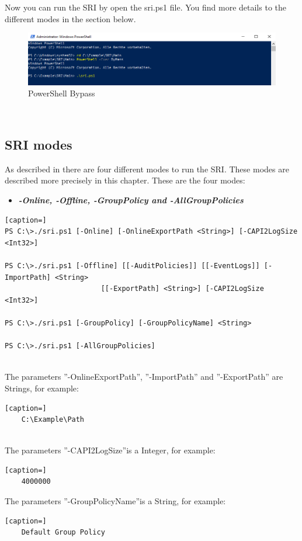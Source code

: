 Now you can run the SRI by open the sri.ps1 file. You find more details to the different modes in the section below.
\begin{figure}[H]
    \centering
    \includegraphics[width=1\linewidth]{assets/sri_ps1.png}
    \caption{PowerShell Bypass}
\end{figure} \ \\

\subsection{SRI modes}
As described in  there are four different modes to run the SRI. These modes are described more precisely in this chapter. These are the four modes:
\begin{itemize}
    \item \textbf{\textit{-Online, -Offline, -GroupPolicy and -AllGroupPolicies}}
\end{itemize}
\begin{lstlisting}[caption=]
PS C:\>./sri.ps1 [-Online] [-OnlineExportPath <String>] [-CAPI2LogSize <Int32>]

PS C:\>./sri.ps1 [-Offline] [[-AuditPolicies]] [[-EventLogs]] [-ImportPath] <String> 
                       [[-ExportPath] <String>] [-CAPI2LogSize <Int32>]

PS C:\>./sri.ps1 [-GroupPolicy] [-GroupPolicyName] <String>

PS C:\>./sri.ps1 [-AllGroupPolicies]
\end{lstlisting}
\clearpage \ \\
The parameters ''-OnlineExportPath'', ''-ImportPath'' and ''-ExportPath'' are Strings, for example:\ \\
\begin{lstlisting}[caption=]
    C:\Example\Path
\end{lstlisting} \ \\
The parameters ''-CAPI2LogSize''is a Integer, for example:\ \\
\begin{lstlisting}[caption=]
    4000000
\end{lstlisting}
The parameters ''-GroupPolicyName''is a String, for example:\ \\
\begin{lstlisting}[caption=]
    Default Group Policy
\end{lstlisting}

